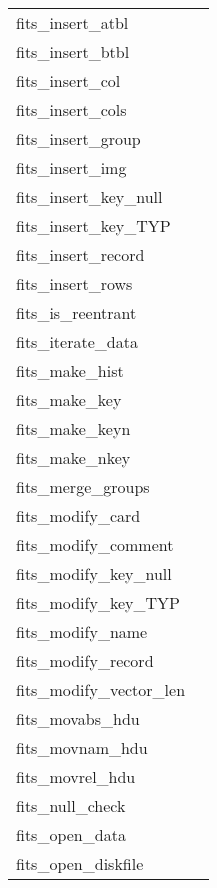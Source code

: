 \documentclass[11pt]{book}
\begin{document}
\newpage
\begin{tabular}{lr}
fits\_insert\_atbl    & \pageref{ffitab} \\
fits\_insert\_btbl    & \pageref{ffibin} \\
fits\_insert\_col   & \pageref{fficol} \\
fits\_insert\_cols  & \pageref{fficls} \\
fits\_insert\_group  & \pageref{ffgtis} \\
fits\_insert\_img     & \pageref{ffiimg} \\
fits\_insert\_key\_null   & \pageref{ffikyu} \\
fits\_insert\_key\_TYP    & \pageref{ffikyx} \\
fits\_insert\_record     & \pageref{ffirec} \\
fits\_insert\_rows  & \pageref{ffirow} \\
fits\_is\_reentrant  & \pageref{reentrant} \\
fits\_iterate\_data   & \pageref{ffiter} \\
fits\_make\_hist      & \pageref{makehist} \\
fits\_make\_key       & \pageref{ffmkky} \\
fits\_make\_keyn      & \pageref{ffkeyn} \\
fits\_make\_nkey      & \pageref{ffnkey} \\
fits\_merge\_groups  & \pageref{ffgtmg} \\
fits\_modify\_card       & \pageref{ffmcrd} \\
fits\_modify\_comment    & \pageref{ffmcom} \\
fits\_modify\_key\_null   & \pageref{ffmkyu} \\
fits\_modify\_key\_TYP    & \pageref{ffmkyx} \\
fits\_modify\_name       & \pageref{ffmnam} \\
fits\_modify\_record     & \pageref{ffmrec} \\
fits\_modify\_vector\_len  & \pageref{ffmvec} \\
fits\_movabs\_hdu     & \pageref{ffmahd} \\
fits\_movnam\_hdu     & \pageref{ffmnhd} \\
fits\_movrel\_hdu     & \pageref{ffmrhd} \\
fits\_null\_check     & \pageref{ffnchk} \\
fits\_open\_data      & \pageref{ffopen} \\
fits\_open\_diskfile    & \pageref{ffopen} \\

\end{tabular}
\end{document}
